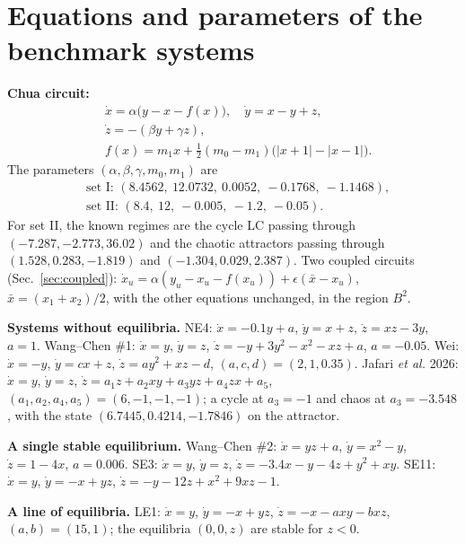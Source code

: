 \appendix

\section{Equations and parameters of the benchmark systems}\label{app:systems}

\textbf{Chua circuit:}\cite{Leonov2011PLA,GuanXie2025}
\begin{equation*}
\begin{split}
&\dot x=\alpha\bigl(y-x-f(x)\bigr),\quad \dot y=x-y+z,\\
&\dot z=-(\beta y+\gamma z),\\
&f(x)=m_1x+\tfrac12(m_0-m_1)\bigl(|x+1|-|x-1|\bigr).
\end{split}
\end{equation*}
The parameters $(\alpha,\beta,\gamma,m_0,m_1)$ are
\begin{equation*}
\begin{split}
&\text{set I: } (8.4562,\ 12.0732,\ 0.0052,\ -0.1768,\ -1.1468),\\
&\text{set II: } (8.4,\ 12,\ -0.005,\ -1.2,\ -0.05).
\end{split}
\end{equation*}
For set II, the known regimes are the cycle LC passing through $(-7.287,-2.773,36.02)$ and the chaotic attractors passing through $(1.528,0.283,-1.819)$ and $(-1.304,0.029,2.387)$. Two coupled circuits (Sec.~\ref{sec:coupled}): $\dot x_u=\alpha(y_u-x_u-f(x_u))+\epsilon(\bar x-x_u)$, $\bar x=(x_1+x_2)/2$, with the other equations unchanged, in the region $B^2$.

\textbf{Systems without equilibria.} NE4: $\dot x=-0.1y+a$, $\dot y=x+z$, $\dot z=xz-3y$, $a=1$. Wang--Chen \#1:\cite{WangChen2012} $\dot x=y$, $\dot y=z$, $\dot z=-y+3y^2-x^2-xz+a$, $a=-0.05$. Wei:\cite{Wei2011} $\dot x=-y$, $\dot y=cx+z$, $\dot z=ay^2+xz-d$, $(a,c,d)=(2,1,0.35)$. Jafari \textit{et al.} 2026:\cite{Jafari2026NoPP} $\dot x=y$, $\dot y=z$, $\dot z=a_1z+a_2xy+a_3yz+a_4zx+a_5$, $(a_1,a_2,a_4,a_5)=(6,-1,-1,-1)$; a cycle at $a_3=-1$ and chaos at $a_3=-3.548$, with the state $(6.7445,0.4214,-1.7846)$ on the attractor.

\textbf{A single stable equilibrium.} Wang--Chen \#2:\cite{WangChen2012} $\dot x=yz+a$, $\dot y=x^2-y$, $\dot z=1-4x$, $a=0.006$. SE3:\cite{Molaie2013} $\dot x=y$, $\dot y=z$, $\dot z=-3.4x-y-4z+y^2+xy$. SE11:\cite{Molaie2013} $\dot x=y$, $\dot y=-x+yz$, $\dot z=-y-12z+x^2+9xz-1$.

\textbf{A line of equilibria.} LE1:\cite{JafariSprott2013} $\dot x=y$, $\dot y=-x+yz$, $\dot z=-x-axy-bxz$, $(a,b)=(15,1)$; the equilibria $(0,0,z)$ are stable for $z<0$.

